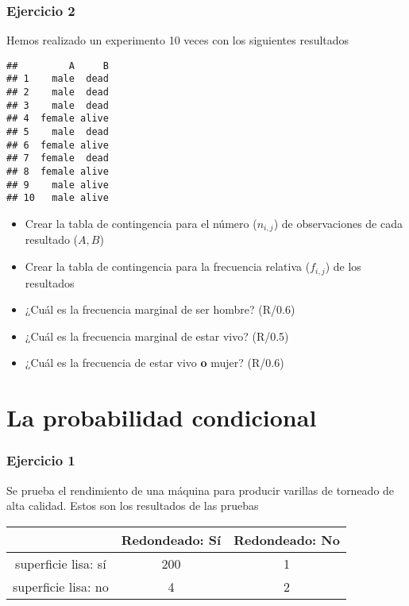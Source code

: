 \documentclass[
]{book}
\providecommand{\tightlist}{%
  \setlength{\itemsep}{0pt}\setlength{\parskip}{0pt}}
\begin{document}
\hypertarget{ejercicio-2-1}{%
\subsubsection{Ejercicio 2}\label{ejercicio-2-1}}

Hemos realizado un experimento 10 veces con los siguientes resultados

\begin{verbatim}
##         A     B
## 1    male  dead
## 2    male  dead
## 3    male  dead
## 4  female alive
## 5    male  dead
## 6  female alive
## 7  female  dead
## 8  female alive
## 9    male alive
## 10   male alive
\end{verbatim}

\begin{itemize}
\tightlist
\item
  Crear la tabla de contingencia para el número (\(n_{i,j}\)) de observaciones de cada resultado (\(A,B\))
\item
  Crear la tabla de contingencia para la frecuencia relativa (\(f_{i,j}\)) de los resultados
\item
  ¿Cuál es la frecuencia marginal de ser hombre? (R/0.6)
\item
  ¿Cuál es la frecuencia marginal de estar vivo? (R/0.5)
\item
  ¿Cuál es la frecuencia de estar vivo \textbf{o} mujer? (R/0.6)
\end{itemize}

\hypertarget{la-probabilidad-condicional-2}{%
\section{La probabilidad condicional}\label{la-probabilidad-condicional-2}}

\hypertarget{ejercicio-1-2}{%
\subsubsection{Ejercicio 1}\label{ejercicio-1-2}}

Se prueba el rendimiento de una máquina para producir varillas de torneado de alta calidad. Estos son los resultados de las pruebas

\begin{longtable}[]{@{}ccc@{}}
\toprule
& Redondeado: Sí & Redondeado: No \\
\midrule
\endhead
superficie lisa: sí & 200 & 1 \\
superficie lisa: no & 4 & 2 \\
\bottomrule
\end{longtable}
\end{document}
